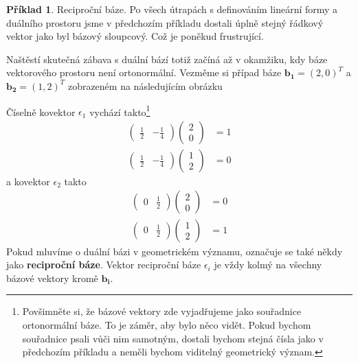 \documentclass[a5paper,12pt]{amsbook}
\theoremstyle{definition}
\newtheorem{example}{Příklad}[chapter]
\newcommand{\myvec}[1]{\bm{#1}}
\newcommand{\mymap}[1]{#1}
\begin{document}
\begin{example}\label{example:covector2}Reciproční báze. Po všech útrapách s definováním
lineární formy a duálního prostoru jsme v předchozím příkladu dostali úplně stejný
řádkový vektor jako byl bázový sloupcový. Což je poněkud frustrující.

Naštěstí skutečná zábava s duální bází totiž začíná až v okamžiku, kdy báze vektorového prostoru
není ortonormální. Vezměme si případ báze $\myvec{b_1} = (2, 0)^T$ a $\myvec{b_2} = (1, 2)^T$
zobrazeném na následujícím obrázku
\begin{center}

\end{center}
Číselně kovektor $\mymap{\epsilon_1}$ vychází takto\footnote{
  Povšimněte si, že bázové vektory zde vyjadřujeme jako souřadnice ortonormální báze. To je záměr,
  aby bylo něco vidět. Pokud bychom souřadnice psali vůči nim samotným, dostali bychom stejná čísla
  jako v předchozím příkladu a neměli bychom viditelný geometrický význam.
}
\begin{equation*}
\begin{split}
\left(\begin{array}{cc}\frac{1}{2} & -\frac{1}{4}\end{array}\right)\left(\begin{array}{c}2\\0\end{array}\right) &= 1\\
\left(\begin{array}{cc}\frac{1}{2} & -\frac{1}{4}\end{array}\right)\left(\begin{array}{c}1\\2\end{array}\right) &= 0
\end{split}
\end{equation*}
a kovektor $\mymap{\epsilon_2}$ takto
\begin{equation*}
\begin{split}
\left(\begin{array}{cc}0 & \frac{1}{2}\end{array}\right)\left(\begin{array}{c}2\\0\end{array}\right) &= 0\\
\left(\begin{array}{cc}0 & \frac{1}{2}\end{array}\right)\left(\begin{array}{c}1\\2\end{array}\right) &= 1
\end{split}
\end{equation*}
Pokud mluvíme o duální bázi v geometrickém významu, označuje se také někdy jako \textbf{reciproční báze}.
Vektor reciproční báze $\mymap{\epsilon_i}$ je vždy kolmý na všechny bázové vektory kromě $\myvec{b_i}$.

\end{example}
\end{document}
